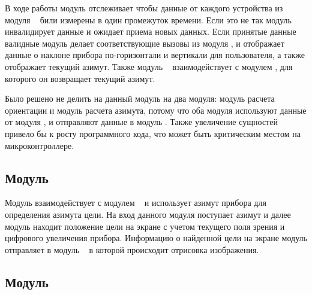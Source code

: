 В ходе работы модуль отслеживает чтобы данные от каждого устройства из модуля \moduleCalib~ били измерены в один промежуток времени. Если это не так
модуль инвалидирует данные и ожидает приема новых данных. Если принятые данные валидные модуль делает соответствующие вызовы из
модуля \moduleGraphics, и отображает данные о наклоне прибора по-горизонтали и вертикали для пользователя, а также отображает текущий азимут.
Также модуль \moduleFlashMemory~ взаимодействует с модулем \moduleFindTarget, для которого он возвращает текущий азимут.

Было решено не делить на данный модуль на два модуля: модуль расчета ориентации и модуль расчета азимута, потому что оба модуля используют данные от модуля
\moduleCalib, и отправляют данные в модуль \moduleGraphics. Также увеличение сущностей привело бы к росту программного кода, что может быть критическим местом
на микроконтроллере.

\subsection{Модуль \moduleFindTarget}

Модуль взаимодействует с модулем \moduleFlashMemory~ и использует азимут прибора для определения азимута цели. 
На вход данного модуля поступает азимут и далее модуль находит положение цели на экране с учетом
текущего поля зрения и цифрового увеличения прибора. Информацию о найденной цели на экране модуль отправляет в модуль \moduleGraphics~ 
в которой происходит отрисовка изображения.

\subsection{Модуль \moduleFlashMemory}

